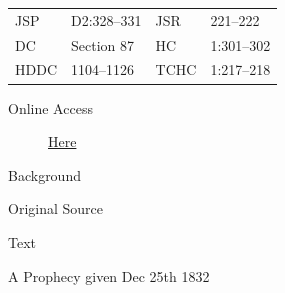 				\begin{tabular}{p{0.5in}p{1in}p{0.5in}p{1in}}
				JSP	 	& D2:328--331	& JSR 		& 221--222 \\
				DC	 	& Section 87 	& HC 		& 1:301--302 \\
				HDDC 	& 1104--1126	& TCHC 		& 1:217--218 \\
				\end{tabular}
			
			\begin{description}
				\item[Online Access] \href{https://www.josephsmithpapers.org/paper-summary/revelation-25-december-1832-dc-87/1}{Here}
			\end{description}
			
			\begin{description}
				\item[Background]
			\end{description}
			
			
			\begin{description}
				\item[Original Source]
			\end{description}
			
			
			\begin{description}
				\item[Text]
			\end{description}
			
				\begin{tightcenter}
					A Prophecy given Dec 25th 1832
				\end{tightcenter}
				
